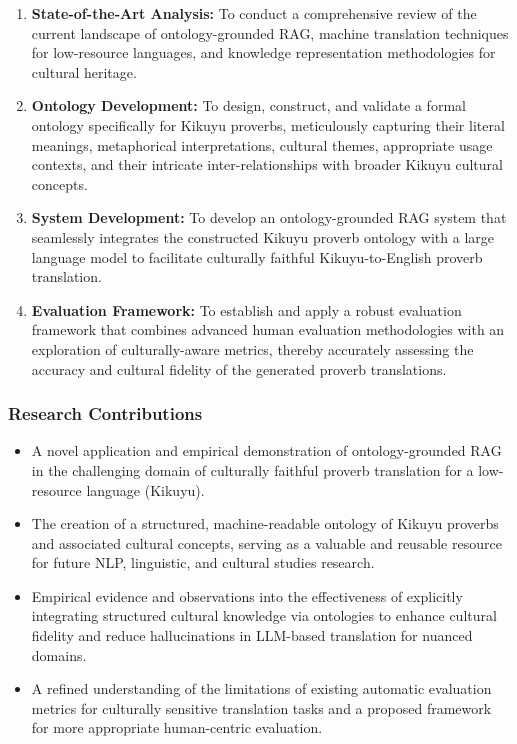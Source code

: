 \documentclass[12pt]{article}
\begin{document}
\begin{enumerate}
\item \textbf{State-of-the-Art Analysis:} To conduct a comprehensive review of the current landscape of ontology-grounded RAG, machine translation techniques for low-resource languages, and knowledge representation methodologies for cultural heritage.

\item \textbf{Ontology Development:} To design, construct, and validate a formal ontology specifically for Kikuyu proverbs, meticulously capturing their literal meanings, metaphorical interpretations, cultural themes, appropriate usage contexts, and their intricate inter-relationships with broader Kikuyu cultural concepts.

\item \textbf{System Development:} To develop an ontology-grounded RAG system that seamlessly integrates the constructed Kikuyu proverb ontology with a large language model to facilitate culturally faithful Kikuyu-to-English proverb translation.

\item \textbf{Evaluation Framework:} To establish and apply a robust evaluation framework that combines advanced human evaluation methodologies with an exploration of culturally-aware metrics, thereby accurately assessing the accuracy and cultural fidelity of the generated proverb translations.
\end{enumerate}

\subsubsection{Research Contributions}

\begin{itemize}
\item A novel application and empirical demonstration of ontology-grounded RAG in the challenging domain of culturally faithful proverb translation for a low-resource language (Kikuyu).

\item The creation of a structured, machine-readable ontology of Kikuyu proverbs and associated cultural concepts, serving as a valuable and reusable resource for future NLP, linguistic, and cultural studies research.

\item Empirical evidence and observations into the effectiveness of explicitly integrating structured cultural knowledge via ontologies to enhance cultural fidelity and reduce hallucinations in LLM-based translation for nuanced domains.

\item A refined understanding of the limitations of existing automatic evaluation metrics for culturally sensitive translation tasks and a proposed framework for more appropriate human-centric evaluation.
\end{itemize}
\end{document}
